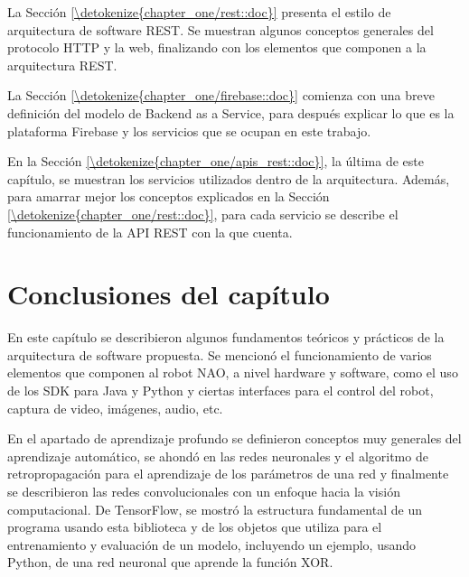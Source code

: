 \documentclass[letterpaper,12pt,spanish]{report}
\begin{document}
La Sección \ref{\detokenize{chapter_one/rest::doc}}
presenta el estilo de arquitectura de software REST.
Se muestran algunos conceptos generales del protocolo
HTTP y la web, finalizando con los elementos 
que componen a la arquitectura REST.

La Sección \ref{\detokenize{chapter_one/firebase::doc}}
comienza con una breve definición del modelo 
de Backend as a Service, para después
explicar lo que es la plataforma Firebase y los servicios
que se ocupan en este trabajo.

En la Sección \ref{\detokenize{chapter_one/apis_rest::doc}},
la última de este capítulo, se muestran los servicios
utilizados dentro de la arquitectura. Además,
para amarrar mejor los conceptos explicados 
en la Sección \ref{\detokenize{chapter_one/rest::doc}},
para cada servicio se describe el funcionamiento
de la API REST con la que cuenta.









\section*{Conclusiones del capítulo}
En este capítulo se describieron algunos 
fundamentos teóricos y prácticos de la arquitectura de software 
propuesta. Se mencionó el funcionamiento de varios elementos que 
componen al robot NAO, a nivel hardware y software, como el uso de los SDK para Java y Python y
ciertas interfaces para el control del robot, captura de 
video, imágenes, audio, etc. 

En el apartado de aprendizaje profundo se definieron 
conceptos muy generales del aprendizaje automático,
se ahondó en las redes neuronales y el algoritmo de 
retropropagación para el aprendizaje de los parámetros
de una red y finalmente se describieron las redes
convolucionales con un enfoque hacia la visión 
computacional. De TensorFlow, se mostró 
la estructura fundamental de un programa usando esta
biblioteca y de los objetos que utiliza
para el entrenamiento y evaluación de un modelo, 
incluyendo un ejemplo, usando Python, de una
red neuronal que aprende la función XOR. 
\end{document}
